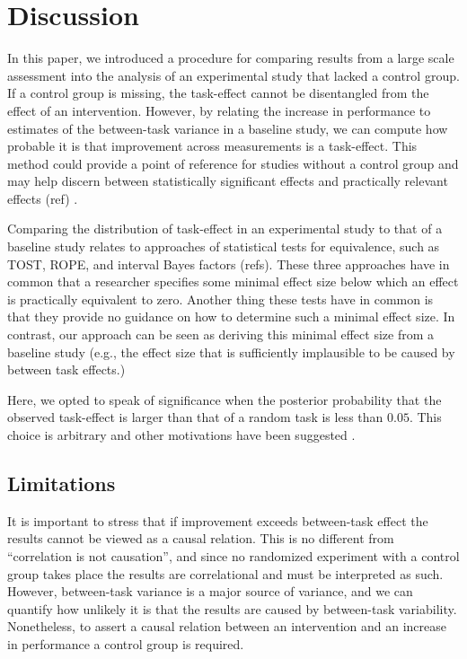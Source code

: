 \documentclass[a4paper]{article}
\newcommand{\DON}	[1] 	{\todo[linecolor=gray, backgroundcolor=white]	{Don: 	{#1}}}
\begin{document}
\section*{Discussion}
In this paper, we introduced a procedure for comparing results from a large scale assessment into the analysis of an experimental study that lacked a control group. If a control group is missing, the task-effect cannot be disentangled from the effect of an intervention. However, by relating the increase in performance to estimates of the between-task variance in a baseline study, we can compute how probable it is that improvement across measurements is a task-effect. This method could provide a point of reference for studies without a control group and may help discern between statistically significant effects and practically relevant effects (ref) \DON{lookup ref}.

Comparing the distribution of task-effect in an experimental study to that of a baseline study relates to approaches of statistical tests for equivalence, such as TOST, ROPE, and interval Bayes factors (refs)\DON{add refs Lakens, Kruschke, ???}. These three approaches have in common that a researcher specifies some minimal effect size below which an effect is practically equivalent to zero. Another thing these tests have in common is that they provide no guidance on how to determine such a minimal effect size. In contrast, our approach can be seen as deriving this minimal effect size from a baseline study (e.g., the effect size that is sufficiently implausible to be caused by between task effects.)

Here, we opted to speak of significance when the posterior probability that the observed task-effect is larger than that of a random task is less than $0.05$. This choice is arbitrary and other motivations have been suggested \cite{McShane2017abandon, BenjaminEtAl2018}.

\subsection*{Limitations}
It is important to stress that if improvement exceeds between-task effect the results cannot be viewed as a causal relation. This is no different from ``correlation is not causation'', and since no randomized experiment with a control group takes place the results are correlational and must be interpreted as such. However, between-task variance is a major source of variance, and we can quantify how unlikely it is that the results are caused by between-task variability. Nonetheless, to assert a causal relation between an intervention and an increase in performance a control group is required.
\end{document}
